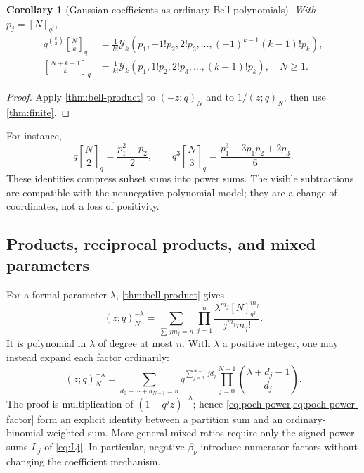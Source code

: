 \documentclass[11pt,a4paper]{article}
\numberwithin{equation}{section}
\newtheorem{corollary}[theorem]{Corollary}
\theoremstyle{definition}
\theoremstyle{remark}
\newcommand{\G}[2]{\genfrac{[}{]}{0pt}{}{#1}{#2}_{q}}
\newcommand{\coef}[2]{[#1^{#2}]}
\newcommand{\Y}{\mathcal Y}
\begin{document}
\begin{corollary}[Gaussian coefficients as ordinary Bell polynomials]
\label{cor:gaussian-bell}
With $p_j=[N]_{q^j}$,
\begin{align}
 q^{\binom k2}\G Nk
 &=\frac1{k!}\Y_k(p_1,-1!p_2,2!p_3,\ldots,
                     (-1)^{k-1}(k-1)!p_k),
 \label{eq:gaussian-bell-e}\\
 \G{N+k-1}k
 &=\frac1{k!}\Y_k(p_1,1!p_2,2!p_3,\ldots,(k-1)!p_k),\quad N\ge1.
 \label{eq:gaussian-bell-h}
\end{align}
\end{corollary}
\begin{proof}
Apply \cref{thm:bell-product} to $(-z;q)_N$ and to $1/(z;q)_N$,
then use \cref{thm:finite}.
\end{proof}
For instance,
\begin{equation}
 q\G N2=\frac{p_1^2-p_2}{2},\qquad
 q^3\G N3=\frac{p_1^3-3p_1p_2+2p_3}{6}.
 \label{eq:gaussian-bell-small}
\end{equation}
These identities compress subset sums into power sums. The visible
subtractions are compatible with the nonnegative polynomial model;
they are a change of coordinates, not a loss of positivity.

\subsection{Products, reciprocal products, and mixed parameters}
For a formal parameter $\lambda$, \cref{thm:bell-product} gives
\begin{equation}
 \coef zn(z;q)_N^{-\lambda}
 =\sum_{\sum j m_j=n}\prod_{j=1}^n
       \frac{\lambda^{m_j}[N]_{q^j}^{m_j}}{j^{m_j}m_j!}.
 \label{eq:poch-power}
\end{equation}
It is polynomial in $\lambda$ of degree at most $n$. With $\lambda$ a
positive integer, one may instead expand each factor ordinarily:
\begin{equation}
 \coef zn(z;q)_N^{-\lambda}
 =\sum_{d_0+\cdots+d_{N-1}=n}
       q^{\sum_{j=0}^{N-1}jd_j}
       \prod_{j=0}^{N-1}\binom{\lambda+d_j-1}{d_j}.
 \label{eq:poch-power-factor}
\end{equation}
The proof is multiplication of $(1-q^jz)^{-\lambda}$; hence
\cref{eq:poch-power,eq:poch-power-factor} form an explicit identity
between a partition sum and an ordinary-binomial weighted sum.
More general mixed ratios require only the signed power sums $L_j$ of
\cref{eq:Lj}. In particular, negative $\beta_\nu$ introduce numerator
factors without changing the coefficient mechanism.
\end{document}
